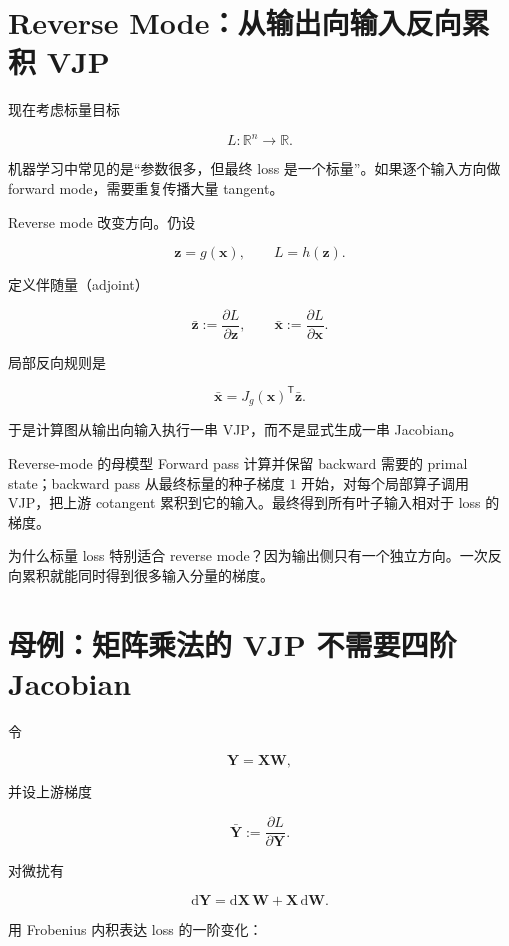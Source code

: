 \documentclass[profile=standard,twoside=false]{ipara-handbook}
\begin{document}
\section{Reverse Mode：从输出向输入反向累积 VJP}

现在考虑标量目标

$$
L:\mathbb{R}^{n}\to\mathbb{R}.
$$

机器学习中常见的是“参数很多，但最终 loss 是一个标量”。如果逐个输入方向做 forward mode，需要重复传播大量 tangent。

Reverse mode 改变方向。仍设

$$
\boldsymbol{z}=g(\boldsymbol{x}),\qquad
L=h(\boldsymbol{z}).
$$

定义伴随量（adjoint）

$$
\bar{\boldsymbol{z}}
:=\frac{\partial L}{\partial\boldsymbol{z}},
\qquad
\bar{\boldsymbol{x}}
:=\frac{\partial L}{\partial\boldsymbol{x}}.
$$

局部反向规则是

$$
\bar{\boldsymbol{x}}
=J_g(\boldsymbol{x})^{\mathsf T}\bar{\boldsymbol{z}}.
$$

于是计算图从输出向输入执行一串 VJP，而不是显式生成一串 Jacobian。

\begin{mentalmodel}{Reverse-mode 的母模型}
Forward pass 计算并保留 backward 需要的 primal state；backward pass 从最终标量的种子梯度 $1$ 开始，对每个局部算子调用 VJP，把上游 cotangent 累积到它的输入。最终得到所有叶子输入相对于 loss 的梯度。
\end{mentalmodel}

为什么标量 loss 特别适合 reverse mode？因为输出侧只有一个独立方向。一次反向累积就能同时得到很多输入分量的梯度。

\section{母例：矩阵乘法的 VJP 不需要四阶 Jacobian}

令

$$
\boldsymbol{Y}=\boldsymbol{X}\boldsymbol{W},
$$

并设上游梯度

$$
\bar{\boldsymbol{Y}}
:=\frac{\partial L}{\partial\boldsymbol{Y}}.
$$

对微扰有

$$
\mathrm{d}\boldsymbol{Y}
=\mathrm{d}\boldsymbol{X}\,\boldsymbol{W}
+\boldsymbol{X}\,\mathrm{d}\boldsymbol{W}.
$$

用 Frobenius 内积表达 loss 的一阶变化：
\end{document}
